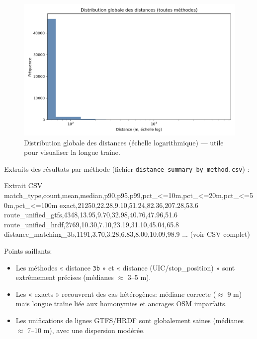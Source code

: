 \begin{figure}[H]
    \centering
    \includegraphics[width=\textwidth]{../figures/chap5/distances_global_hist.png}
    \caption[Distribution globale (log)]{Distribution globale des distances (échelle logarithmique) — utile pour visualiser la longue traîne.}
\end{figure}

\noindent Extraits des résultats par méthode (fichier \texttt{distance\_summary\_by\_method.csv}) :

\begin{codebox}{Extrait CSV}
match_type,count,mean,median,p90,p95,p99,pct_<=10m,pct_<=20m,pct_<=50m,pct_<=100m
exact,21250,22.28,9.10,51.24,82.36,207.28,53.6%
route_unified_gtfs,4348,13.95,9.70,32.98,40.76,47.96,51.6%
route_unified_hrdf,2769,10.30,7.10,23.19,31.10,45.04,65.8%
distance_matching_3b,1191,3.70,3.28,6.83,8.00,10.09,98.9%
... (voir CSV complet)
\end{codebox}

Points saillants:
\begin{itemize}
    \item Les méthodes « distance \texttt{3b} » et « distance (UIC/stop\_position) » sont extrêmement précises (médianes \(\approx\) 3–5 m).
    \item Les « exacts » recouvrent des cas hétérogènes: médiane correcte (\(\approx\) 9 m) mais longue traîne liée aux homonymies et ancrages OSM imparfaits.
    \item Les unifications de lignes GTFS/HRDF sont globalement saines (médianes \(\approx\) 7–10 m), avec une dispersion modérée.
\end{itemize}


